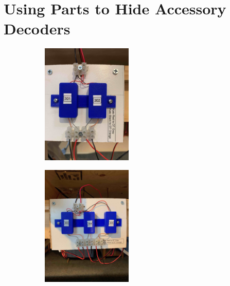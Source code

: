 \section{Using Parts to Hide Accessory Decoders}

    \begin{figure}
        \centering
        \begin{subfigure}[b]{width=\textwidth}
            \centering
            \includegraphics[width=0.475\textwidth]{./figures/printer/TwoBoxes.jpg}
            \label{fig:mean and std of net14}
        \end{subfigure}
        \hfill
        \begin{subfigure}[b]
            \centering 
            \includegraphics[width=0.475\textwidth]{./figures/printer/ThreeBoxes.jpg}
            \label{fig:mean and std of net24}

\end{subfigure}
\end{figure}
